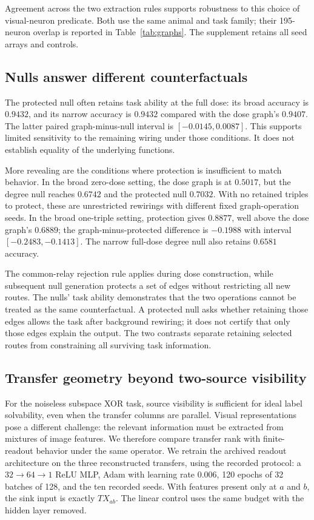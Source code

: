 Agreement across the two extraction rules supports robustness to this
choice of visual-neuron predicate. Both use the same animal and task
family; their 195-neuron overlap is reported in Table~\ref{tab:graphs}.
The supplement retains all seed arrays and controls.

\subsection{Nulls answer different counterfactuals}
\label{sec:exceptions}

The protected null often retains task ability at the full dose: its broad
accuracy is $0.9432$, and its narrow accuracy is $0.9432$ compared with
the dose graph's $0.9407$. The latter paired graph-minus-null interval is
$[-0.0145,0.0087]$. This supports limited sensitivity to the remaining
wiring under those conditions. It does not establish equality of the
underlying functions.

More revealing are the conditions where protection is insufficient to
match behavior. In the broad zero-dose setting, the dose graph is at
$0.5017$, but the degree null reaches $0.6742$ and the protected null
$0.7032$. With no retained triples to protect, these are unrestricted
rewirings with different fixed graph-operation seeds. In the broad
one-triple setting, protection gives $0.8877$, well above the dose graph's
$0.6889$; the graph-minus-protected difference is $-0.1988$ with interval
$[-0.2483,-0.1413]$. The narrow full-dose degree null also retains
$0.6581$ accuracy.

The common-relay rejection rule
applies during dose construction, while subsequent null generation
protects a set of edges without restricting all new routes. The nulls'
task ability demonstrates that the two operations cannot be treated as
the same counterfactual. A protected null asks whether retaining those
edges allows the task after background rewiring; it does not certify
that only those edges explain the output. The two contrasts separate retaining selected routes from constraining
all surviving task information.

\subsection{Transfer geometry beyond two-source visibility}
\label{sec:images}

For the noiseless subspace XOR task, source visibility is sufficient for
ideal label solvability, even when the transfer columns are parallel. Visual
representations pose a different challenge: the relevant information must be
extracted from mixtures of image features. We therefore compare transfer rank
with finite-readout behavior under the same operator. We retrain the archived
readout architecture on the three reconstructed transfers, using the recorded
protocol: a $32\!\to\!64\!\to\!1$ ReLU MLP, Adam with learning rate
0.006, 120 epochs of 32 batches of 128, and the ten recorded seeds. With
features present only at $a$ and $b$, the sink input is exactly $TX_{ab}$.
The linear control uses the same budget with the hidden layer removed.


